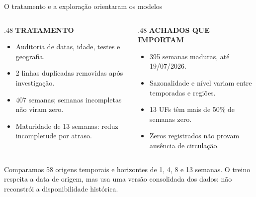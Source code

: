 \documentclass[10pt,aspectratio=169]{beamer}
\newcommand{\rotulo}[1]{{\color{pucblue}\small\bfseries\MakeUppercase{#1}}\par\vspace{3pt}}
\begin{document}
\begin{frame}{O tratamento e a exploração orientaram os modelos}
  \begin{columns}[T,onlytextwidth]
    \begin{column}{.48\textwidth}
      \rotulo{Tratamento}
      \begin{itemize}
        \item Auditoria de datas, idade, testes e geografia.
        \item 2 linhas duplicadas removidas após investigação.
        \item 407 semanas; semanas incompletas não viram zero.
        \item Maturidade de 13 semanas: reduz incompletude por atraso.
      \end{itemize}
    \end{column}
    \begin{column}{.48\textwidth}
      \rotulo{Achados que importam}
      \begin{itemize}
        \item 395 semanas maduras, até 19/07/2026.
        \item Sazonalidade e nível variam entre temporadas e regiões.
        \item 13 UFs têm mais de 50\% de semanas zero.
        \item Zeros registrados não provam ausência de circulação.
      \end{itemize}
    \end{column}
  \end{columns}
  \vspace{2pt}
  \begin{cartao}\small Comparamos 58 origens temporais e horizontes de 1, 4, 8 e 13 semanas. O treino respeita a data de origem, mas usa uma versão consolidada dos dados: não reconstrói a disponibilidade histórica.\end{cartao}
\end{frame}
\end{document}
